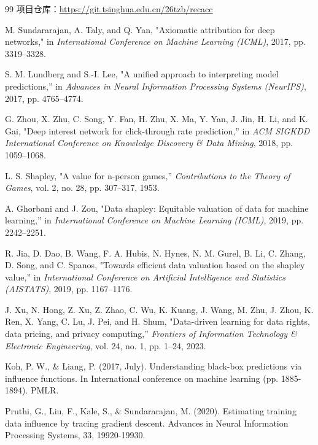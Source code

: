 \documentclass[12pt,a4paper]{ctexart}
\theoremstyle{definition}
\theoremstyle{plain}
\begin{document}
\begin{thebibliography}{99}
项目仓库：\url{https://git.tsinghua.edu.cn/26tzb/recacc}

M. Sundararajan, A. Taly, and Q. Yan, "Axiomatic attribution for deep networks," in \textit{International Conference on Machine Learning (ICML)}, 2017, pp. 3319–3328.

S. M. Lundberg and S.-I. Lee, "A unified approach to interpreting model predictions,” in \textit{Advances in Neural Information Processing Systems (NeurIPS)}, 2017, pp. 4765–4774.

G. Zhou, X. Zhu, C. Song, Y. Fan, H. Zhu, X. Ma, Y. Yan, J. Jin, H. Li, and K. Gai, "Deep interest network for click-through rate prediction,” in \textit{ACM SIGKDD International Conference on Knowledge Discovery \& Data Mining}, 2018, pp. 1059–1068.

L. S. Shapley, "A value for n-person games,” \textit{Contributions to the Theory of Games}, vol. 2, no. 28, pp. 307–317, 1953.

A. Ghorbani and J. Zou, "Data shapley: Equitable valuation of data for machine learning,” in \textit{International Conference on Machine Learning (ICML)}, 2019, pp. 2242–2251.

R. Jia, D. Dao, B. Wang, F. A. Hubis, N. Hynes, N. M. Gurel, B. Li, C. Zhang, D. Song, and C. Spanos, "Towards efficient data valuation based on the shapley value,” in \textit{International Conference on Artificial Intelligence and Statistics (AISTATS)}, 2019, pp. 1167–1176.

J. Xu, N. Hong, Z. Xu, Z. Zhao, C. Wu, K. Kuang, J. Wang, M. Zhu, J. Zhou, K. Ren, X. Yang, C. Lu, J. Pei, and H. Shum, "Data-driven learning for data rights, data pricing, and privacy computing,” \textit{Frontiers of Information Technology \& Electronic Engineering}, vol. 24, no. 1, pp. 1–24, 2023.

Koh, P. W., \& Liang, P. (2017, July). Understanding black-box predictions via influence functions. In International conference on machine learning (pp. 1885-1894). PMLR.

Pruthi, G., Liu, F., Kale, S., \& Sundararajan, M. (2020). Estimating training data influence by tracing gradient descent. Advances in Neural Information Processing Systems, 33, 19920-19930.


\end{thebibliography}
\end{document}
